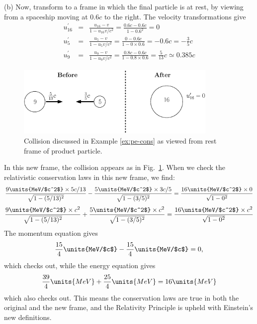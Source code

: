 \begin{example}{}
(b) Now, transform to a frame in which the final particle is at rest, by
viewing from a spaceship moving at $0.6c$ to the right.  The velocity
transformations give
\begin{eqnarray}
u_{16}^\prime &=& \frac{u_{16}-v}{1 - u_{16}v/c^2} 
   = \frac{0.6c -0.6 c}{1-0.6^2} = 0 \\
u_{5}^\prime &=& \frac{u_{5}-v}{1 - u_{5}v/c^2} 
   = \frac{0 -0.6 c}{1-0\times 0.6} = -0.6c = -\frac{3}{5}c \\
u_{9}^\prime &=& \frac{u_{9}-v}{1 - u_{9}v/c^2} 
   = \frac{0.8c -0.6 c}{1-0.8\times 0.6} = \frac{5}{13}c \simeq 0.385c 
\end{eqnarray}
\begin{figure}[b]
\begin{center}
\includegraphics[width=3.8in]{relativistic_momentum_and_energy/relpande4.eps}
\end{center}
\caption{Collision discussed in Example \ref{ex:pe-cons} as viewed from 
rest frame 
of product particle.}
\label{fig:junk2}
\end{figure}
In this new frame, the collision appears as in Fig.~\ref{fig:junk2}.
When we check the relativistic conservation laws in this new frame, we find: 
\begin{equation}
\frac{9\units{MeV/$c^2$}\times 5c/13}{\sqrt{1 - (5/13)^2}} 
    -  \frac{5\units{MeV/$c^2$}\times 3c/5}{\sqrt{1 - (3/5)^2}}= 
\frac{16\units{MeV/$c^2$}\times 0}{\sqrt{1 - 0^2}}
\end{equation}
\begin{equation}
\frac{9\units{MeV/$c^2$}\times c^2}{\sqrt{1 - (5/13)^2}} 
 + \frac{5\units{MeV/$c^2$}\times c^2}{\sqrt{1 - (3/5)^2}}= 
\frac{16\units{MeV/$c^2$}\times c^2}{\sqrt{1 - 0^2}}
\end{equation}
The momentum equation gives
\begin{equation}
\frac{15}{4}\units{MeV/$c$} -\frac{15}{4}\units{MeV/$c$} = 0,
\end{equation}
which checks out, while the energy equation gives
\begin{equation}
\frac{39}{4}\units{MeV} +\frac{25}{4}\units{MeV} = 16\units{MeV}
\end{equation}
which also checks out.  This means the conservation laws are true in
both the original and the new frame, and the Relativity Principle is
upheld with Einstein's new definitions.
\end{example}


